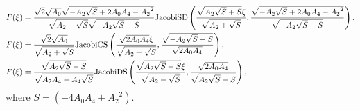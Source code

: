 \documentclass[prd,aps,floats,showkeys,nofootinbib,notitlepage]{revtex4}
\begin{document}
\begin{subequations}
\begin{align}
			&F(\xi)=  \frac{{\sqrt 2 \sqrt {{A_0}} \sqrt { - {A_2} \sqrt S  + 2 {A_0} {A_4} - {A_2}^2} }}{{\sqrt {{A_2} + \sqrt S } \sqrt { - {A_2} \sqrt S  - S} }}{\text{JacobiSD}}\left( {\frac{{\sqrt {{A_2} \sqrt S  + S} \xi }}{{\sqrt {{A_2} + \sqrt S } }},\frac{{\sqrt { - {A_2} \sqrt S  + 2 {A_0} {A_4} - {A_2}^2} }}{{\sqrt { - {A_2} \sqrt S  - S} }}} \right), \hfill \\
			&F(\xi)=  \frac{{\sqrt 2 \sqrt {{A_0}} }}{{\sqrt {{A_2} + \sqrt S } }}{\text{JacobiCS}}\left( {\frac{{ \sqrt {2{A_0} {A_4}} \xi }}{{\sqrt {{A_2} + \sqrt S } }},\frac{{\sqrt { - {A_2} \sqrt S  - S} }}{{\sqrt {2{A_0} {A_4}} }}} \right), \hfill \\
			&F(\xi)=  \frac{{\sqrt {{A_2} \sqrt S  - S} }}{{\sqrt {{A_2} {A_4} - {A_4} \sqrt S } }}{\text{JacobiDS}}\left( {\frac{{\sqrt {{A_2} \sqrt S  - S} \xi }}{{\sqrt {{A_2} - \sqrt S } }},\frac{{\sqrt {2{A_0} {A_4}} }}{{\sqrt {{A_2} \sqrt S  - S} }}} \right),
		\end{align}
	\end{subequations}
	where $S = \left( { - 4 {A_0} {A_4} + {A_2}^2} \right)$. 
	
\end{document}
